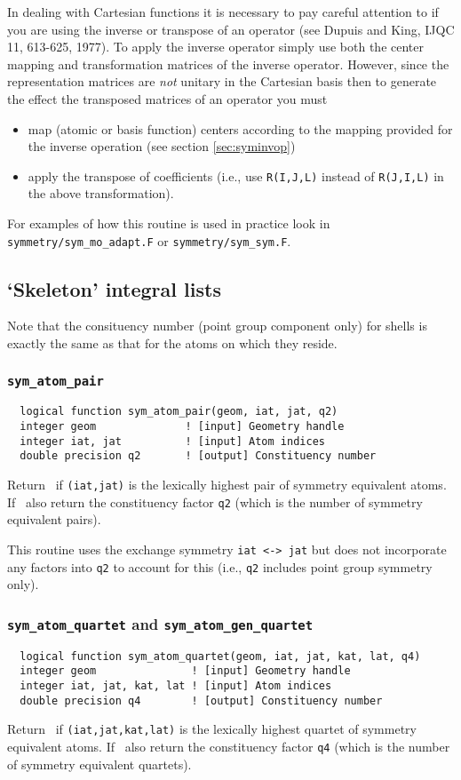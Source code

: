 In dealing with Cartesian functions it is necessary to pay careful
attention to if you are using the inverse or transpose of an operator
(see Dupuis and King, IJQC 11, 613-625, 1977).  To apply the inverse
operator simply use both the center mapping and transformation
matrices of the inverse operator.  However, since the representation
matrices are {\em not} unitary in the Cartesian basis then to generate
the effect the transposed matrices of an operator you must
\begin{itemize}
\item map (atomic or basis function) centers according to the mapping
  provided for the inverse operation (see section \ref{sec:syminvop})
\item apply the transpose of coefficients (i.e., use \verb+R(I,J,L)+
  instead of \verb+R(J,I,L)+ in the above transformation).
\end{itemize}

For examples of how this routine is used in practice look in
\verb+symmetry/sym_mo_adapt.F+ or \verb+symmetry/sym_sym.F+.

\subsection{`Skeleton' integral lists}

Note that the consituency number (point group component only) for
shells is exactly the same as that for the atoms on which they reside.

\subsubsection{{\tt sym\_atom\_pair}}
\begin{verbatim}
  logical function sym_atom_pair(geom, iat, jat, q2)
  integer geom              ! [input] Geometry handle
  integer iat, jat          ! [input] Atom indices
  double precision q2       ! [output] Constituency number
\end{verbatim}
Return \TRUE\ if \verb+(iat,jat)+ is the lexically highest pair of
symmetry equivalent atoms. If \TRUE\ also return the constituency
factor \verb+q2+ (which is the number of symmetry equivalent pairs).

This routine uses the exchange symmetry \verb+iat <-> jat+ but does
not incorporate any factors into \verb+q2+ to account for this (i.e.,
\verb+q2+ includes point group symmetry only).

\subsubsection{{\tt sym\_atom\_quartet} and {\tt sym\_atom\_gen\_quartet}}
\begin{verbatim}
  logical function sym_atom_quartet(geom, iat, jat, kat, lat, q4)
  integer geom               ! [input] Geometry handle
  integer iat, jat, kat, lat ! [input] Atom indices
  double precision q4        ! [output] Constituency number
\end{verbatim}
Return \TRUE\ if \verb+(iat,jat,kat,lat)+ is the lexically highest
quartet of symmetry equivalent atoms. If \TRUE\ also return the
constituency factor \verb+q4+ (which is the number of symmetry
equivalent quartets).


